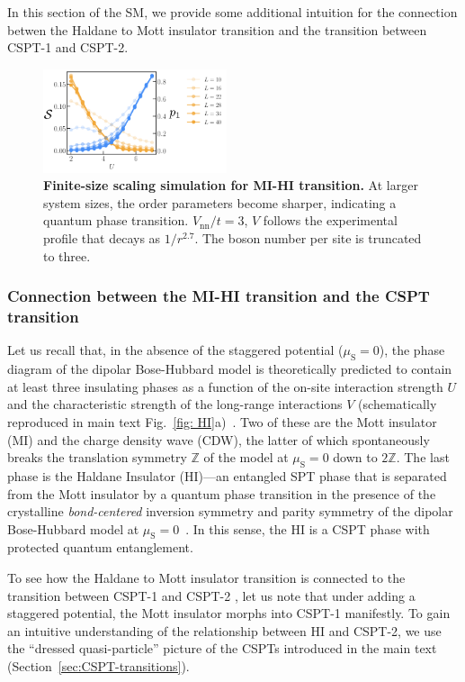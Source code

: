 \documentclass[preprint,superscriptaddress,floatfix, nofootinbib]{revtex4-2}
\begin{document}
In this section of the SM, we provide some additional intuition for the connection betwen the Haldane to Mott insulator transition and the transition between CSPT-1 and CSPT-2.


\begin{figure}
    \centering
    \includegraphics[width=0.48\textwidth]{figures/Finite_size_scaling.pdf}
    \caption{\textbf{Finite-size scaling simulation for MI-HI transition.} At larger system sizes, the order parameters become sharper, indicating a quantum phase transition. $V_\mathrm{nn}/t=3$, $V$ follows the experimental profile that decays as $1/r^{2.7}$. The boson number per site is truncated to three.
    }
    \label{fig: finite_size_scaling}
\end{figure}

\subsubsection*{Connection between the MI-HI transition and the CSPT transition}

Let us recall that, in the absence of the staggered potential ($\mu_{\text{S}} = 0$), the phase diagram of the dipolar Bose-Hubbard model is theoretically predicted to contain at least three insulating phases as a function of the on-site interaction strength $U$ and the characteristic strength of the long-range interactions $V$ (schematically reproduced in main text Fig.~\ref{fig: HI}a)~\cite{Torre2006, Berg2008}. 
%
Two of these are the Mott insulator (MI) and the charge density wave (CDW), the latter of which spontaneously breaks the translation symmetry $\mathbb{Z}$ of the model at $\mu_{\text{S}} = 0$ down to $2\mathbb{Z}$.
%
The last phase is the Haldane Insulator (HI)---an entangled SPT phase that is separated from the Mott insulator by a quantum phase transition in the presence of the crystalline \textit{bond-centered} inversion symmetry and parity symmetry of the dipolar Bose-Hubbard model at $\mu_{\text{S}} = 0$~\cite{Pollmann2010}.
%
In this sense, the HI is a CSPT phase with protected quantum entanglement.

To see how the Haldane to Mott insulator transition is connected to the transition between CSPT-1 and CSPT-2 \cite{Sahay2025}, let us note that under adding a staggered potential, the Mott insulator morphs into CSPT-1 manifestly. 
%
To gain an intuitive understanding of the relationship between HI and CSPT-2, we use the ``dressed quasi-particle'' picture of the CSPTs introduced in the main text (Section~\ref{sec:CSPT-transitions}).
%
\end{document}
